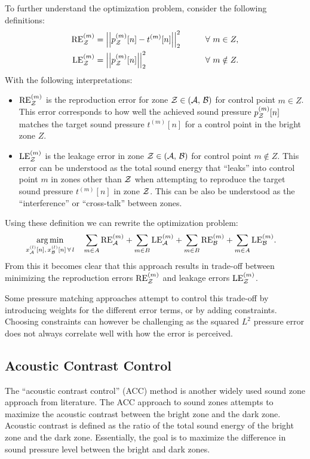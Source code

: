 To further understand the optimization problem, consider the following definitions: 
\begin{alignat}{2}
    \text{RE}^{(m)}_\zz &= \norm[2][2]{p_\zz^{(m)}[n] - t^{(m)}[n]} \qquad&& \forall\,\, m\in Z, \label{eq:sound_zone:approaches:RE}\\
    \text{LE}^{(m)}_\zz &= \norm[2][2]{p_\zz^{(m)}[n]} \qquad&& \forall\,\, m\notin Z. \label{eq:sound_zone:approaches:LE} 
\end{alignat}
With the following interpretations:
\begin{itemize}
    \item $\text{RE}^{(m)}_{\mathcal{Z}}$ is the reproduction error for zone $\mathcal{Z} \in \left(\mathcal{A},\,\mathcal{B}\right)$ 
        for control point $m \in Z$.
        This error corresponds to how well the achieved sound pressure $p_{\mathcal{Z}}^{(m)}[n]$ matches the 
        target sound pressure $t^{(m)}[n]$ for a control point in the 
        bright zone $Z$. 
    \item $\text{LE}^{(m)}_{\mathcal{Z}}$ is the leakage error in zone $\mathcal{Z} \in \left(\mathcal{A},\,\mathcal{B}\right)$ for control point $m \notin Z$.
        This error can be understood as the total sound energy that ``leaks'' into control point $m$ in zones 
        other than $\mathcal{Z}$ when attempting to reproduce the target sound pressure $t^{(m)}[n]$ in zone $\mathcal{Z}$. 
        This can be also be understood as the ``interference'' or ``cross-talk'' between zones.
\end{itemize}
Using these definition we can rewrite the optimization problem:
\begin{align}
    \operatorname*{arg\,min}_{x_{\mathcal{A}}^{(l)}[n],\,x_{\mathcal{B}}^{(l)}[n]\,\forall\,l}\quad 
       &\sum_{m\in A} \text{RE}^{(m)}_{\mathcal{A}} +  \sum_{m\in B} \text{LE}^{(m)}_{\mathcal{A}} + \sum_{m\in B} \text{RE}^{(m)}_{\mathcal{B}} + \sum_{m\in A} \text{LE}^{(m)}_{\mathcal{B}}
   .
\end{align}
From this it becomes clear that this approach results in trade-off between minimizing the 
reproduction errors $\text{RE}^{(m)}_{\mathcal{Z}}$ 
and leakage errors $\text{LE}^{(m)}_{\mathcal{Z}}$. 

Some pressure matching approaches attempt to control this trade-off by introducing weights for the different error terms, 
or by adding constraints.
Choosing constraints can however be challenging as the squared $L^2$ pressure error does not always correlate well with how
the error is perceived.

\subsection{Acoustic Contrast Control}
\label{ch:sound_zone:approaches:acoustic_contrast_control}
The ``acoustic contrast control'' (ACC) method is another widely used sound zone approach from literature.
The ACC approach to sound zones attempts to maximize the acoustic contrast between the bright zone and the dark zone. 
Acoustic contrast is defined as the ratio of the total sound energy of the bright zone and the dark zone.
Essentially, the goal is to maximize the difference in sound pressure level between the bright and dark zones.

